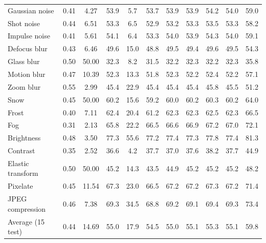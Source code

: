 \begin{table}[t]
\begin{tabular}{l|cc|cc|cc|cccc}
        Gaussian noise & 0.41 & 4.27 & 53.9 & 5.7 & 53.7 & 53.9 & 53.9 & 54.2 & 54.0 & 59.0 \\
        Shot noise & 0.44 & 6.51 & 53.3 & 6.5 & 52.9 & 53.2 & 53.3 & 53.5 & 53.3 & 58.2 \\
        Impulse noise & 0.41 & 5.61 & 54.1 & 6.4 & 53.3 & 54.0 & 53.9 & 54.3 & 54.0 & 59.1 \\
        Defocus blur & 0.43 & 6.46 & 49.6 & 15.0 & 48.8 & 49.5 & 49.4 & 49.6 & 49.5 & 54.3 \\
        Glass blur & 0.50 & 50.00 & 32.3 & 8.2 & 31.5 & 32.2 & 32.3 & 32.2 & 32.3 & 35.8 \\
        Motion blur & 0.47 & 10.39 & 52.3 & 13.3 & 51.8 & 52.3 & 52.2 & 52.4 & 52.2 & 57.1 \\
        Zoom blur & 0.55 & 2.99 & 45.4 & 22.9 & 45.4 & 45.4 & 45.4 & 45.8 & 45.5 & 51.2 \\
        Snow & 0.45 & 50.00 & 60.2 & 15.6 & 59.2 & 60.0 & 60.2 & 60.3 & 60.2 & 64.0 \\
        Frost & 0.40 & 7.11 & 62.4 & 20.4 & 61.2 & 62.3 & 62.3 & 62.5 & 62.3 & 66.5 \\
        Fog & 0.31 & 2.13 & 65.8 & 22.2 & 66.5 & 66.6 & 66.9 & 67.2 & 67.0 & 72.1 \\
        Brightness & 0.48 & 3.50 & 77.3 & 55.6 & 77.2 & 77.4 & 77.3 & 77.8 & 77.4 & 81.3 \\
        Contrast & 0.35 & 2.52 & 36.6 & 4.2 & 37.7 & 37.0 & 37.6 & 38.2 & 37.7 & 44.9 \\
        Elastic transform & 0.50 & 50.00 & 45.2 & 14.3 & 43.5 & 44.9 & 45.2 & 45.2 & 45.2 & 48.2 \\
        Pixelate & 0.45 & 11.54 & 67.3 & 23.0 & 66.5 & 67.2 & 67.2 & 67.3 & 67.2 & 71.4 \\
        JPEG compression & 0.46 & 7.38 & 69.3 & 34.5 & 68.8 & 69.2 & 69.1 & 69.4 & 69.3 & 73.4 \\
        \midrule
        Average (15 test) & 0.44 & 14.69 & 55.0 & 17.9 & 54.5 & 55.0 & 55.1 & 55.3 & 55.1 & 59.8 \\
        \bottomrule
    \end{tabular}
\end{table}
